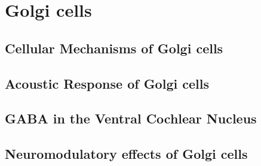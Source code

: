 
\section{Golgi cells}
    
\subsection{Cellular Mechanisms of Golgi cells}
    
\subsection{Acoustic Response of Golgi cells}
    
\subsection{GABA in the Ventral Cochlear Nucleus}
    
\subsection{Neuromodulatory effects of Golgi cells}

